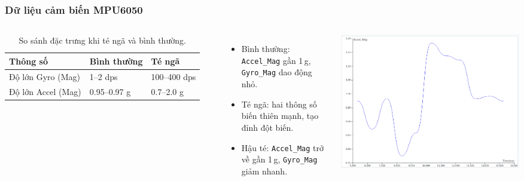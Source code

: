 \begin{frame}[t]
\frametitle{Dữ liệu cảm biến MPU6050}
\begin{columns}[T]
    \begin{table}[h!]
        \caption{So sánh đặc trưng khi té ngã và bình thường.}
        \centering
        \footnotesize
        \begin{tabularx}{\linewidth}{|l|X|X|}
            \hline
            Thông số & Bình thường & Té ngã \\
            \hline
            Độ lớn Gyro (Mag) & 1–2 dps & 100–400 dps \\
            \hline
            Độ lớn Accel (Mag) & 0.95–0.97 g & 0.7–2.0 g \\
            \hline
        \end{tabularx}
    \end{table}
    \vspace{0.2cm}
    \begin{itemize}
        \item Bình thường: \texttt{Accel\_Mag} gần 1\,g, \texttt{Gyro\_Mag} dao động nhỏ.
        \item Té ngã: hai thông số biến thiên mạnh, tạo đỉnh đột biến.
        \item Hậu té: \texttt{Accel\_Mag} trở về gần 1\,g, \texttt{Gyro\_Mag} giảm nhanh.
    \end{itemize}

    \centering
    \includegraphics[width=\linewidth]{images/accel_time.png}
\end{columns}
\end{frame}

